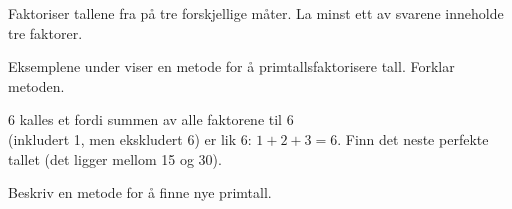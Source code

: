 Faktoriser tallene fra  på tre forskjellige måter. La minst ett av svarene inneholde tre faktorer.

Eksemplene under viser en metode for å primtallsfaktorisere tall. Forklar metoden.
\begin{center}
	\parbox{0.35\linewidth}{
		} \qquad
	\parbox{0.35\linewidth}{
		}
\end{center} 

 \vs
{}

6 kalles et  fordi summen av alle faktorene til 6 \\(inkludert 1, men ekskludert 6) er lik 6: $ 1+2+3=6 $. Finn det neste perfekte tallet (det ligger mellom 15 og 30).

Beskriv en metode for å finne nye primtall.


